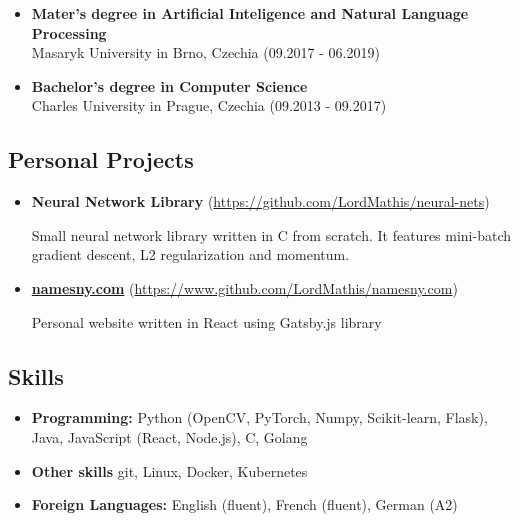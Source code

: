 \documentclass[a4,12pt]{article}
\providecommand{\tightlist}{%
  \setlength{\itemsep}{0pt}\setlength{\parskip}{0pt}}
\begin{document}
\begin{itemize}
\item
  \textbf{Mater's degree in Artificial Inteligence and Natural Language Processing}\\
  Masaryk University in Brno, Czechia \hfill (09.2017 - 06.2019)
\item
  \textbf{Bachelor's degree in Computer Science}\\
  Charles University in Prague, Czechia \hfill (09.2013 - 09.2017)
\end{itemize}

\subsection*{Personal Projects}\label{projects}

\begin{itemize}

\item
    \textbf{Neural Network Library} (\href{https://github.com/LordMathis/neural-nets}{https://github.com/LordMathis/neural-nets})

    Small neural network library written in C from scratch. It features mini-batch gradient descent, L2 regularization and momentum.

\item
  \textbf{\href{https://namesny.com}{namesny.com}} (\href{https://www.github.com/LordMathis/namesny.com}{https://www.github.com/LordMathis/namesny.com})

  Personal website written in React using Gatsby.js library
  

\end{itemize}

\subsection*{Skills}\label{skills}

\begin{itemize}
\tightlist
\item
  \textbf{Programming:} Python (OpenCV, PyTorch, Numpy, Scikit-learn, Flask), Java, JavaScript (React, Node.js), C, Golang
\item
  \textbf{Other skills} git, Linux, Docker, Kubernetes
\item
  \textbf{Foreign Languages:} English (fluent), French (fluent), German (A2)
\end{itemize}
\end{document}

